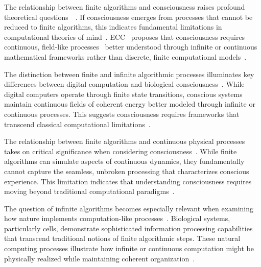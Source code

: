 The relationship between finite algorithms and consciousness raises profound theoretical questions~~\cite{hofstadter1999godel,clark1998being,gallagher2020phenomenological}. If consciousness emerges from processes that cannot be reduced to finite algorithms, this indicates fundamental limitations in computational theories of mind~. ECC~ proposes that consciousness requires continuous, field-like processes~ better understood through infinite or continuous mathematical frameworks rather than discrete, finite computational models~\cite{Floyd2014,hunt2023fields,seth2021being}.

The distinction between finite and infinite algorithmic processes illuminates key differences between digital computation and biological consciousness~\cite{Kozen2006,searle1980minds,Thompson2007}. While digital computers operate through finite state transitions, conscious systems maintain continuous fields of coherent energy better modeled through infinite or continuous processes. This suggests consciousness requires frameworks that transcend classical computational limitations~\cite{butlin2023consciousnessartificialintelligenceinsights,mcfadden2020integrating}.

The relationship between finite algorithms and continuous physical processes takes on critical significance when considering consciousness~\cite{PourEl1989,damasio2006descartes,varela2017embodied}. While finite algorithms can simulate aspects of continuous dynamics, they fundamentally cannot capture the seamless, unbroken processing that characterizes conscious experience. This limitation indicates that understanding consciousness requires moving beyond traditional computational paradigms~\cite{Sipser2012,block1995confusion,seth2024conscious}.

The question of infinite algorithms becomes especially relevant when examining how nature implements computation-like processes~\cite{Soare2016,hunt2024electromagnetic,Larkum2022}. Biological systems, particularly cells, demonstrate sophisticated information processing capabilities that transcend traditional notions of finite algorithmic steps. These natural computing processes illustrate how infinite or continuous computation might be physically realized while maintaining coherent organization~\cite{vanLeeuwen2012,Lyon2021,Bicknell2021}.

